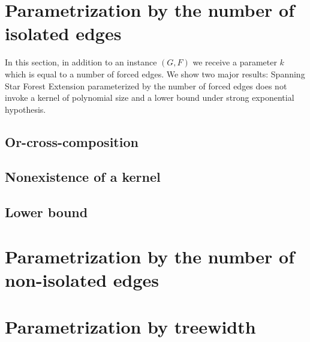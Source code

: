 \documentclass[en]{pracamgr}
\newcommand{\ssfep}{{\sc Spanning Star Forest Extension}}
\begin{document}
\section{Parametrization by the number of isolated edges}

In this section, in addition to an instance $(G,F)$ we receive a parameter $k$ which is equal to a number of forced edges. We show two major results: \ssfep{} parameterized by the number of forced edges does not invoke a kernel of polynomial size and a lower bound under strong exponential hypothesis.

\subsection{Or-cross-composition}

\subsection{Nonexistence of a kernel}

\subsection{Lower bound}

\section{Parametrization by the number of non-isolated edges}

\section{Parametrization by treewidth}
\end{document}
